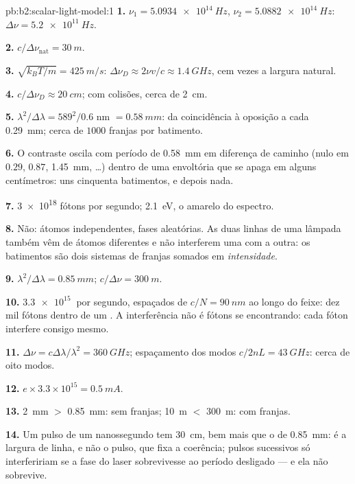 \begin{solution}{pb:b2:scalar-light-model:1}
\textbf{1.} $\nu_1 = \qty{5.0934e14}{Hz}$, $\nu_2 = \qty{5.0882e14}{Hz}$: $\Delta\nu = \qty{5.2e11}{Hz}$.

\textbf{2.} $c/\Delta\nu_{\text{nat}} = \qty{30}{m}$.

\textbf{3.} $\sqrt{k_BT/m} = \qty{425}{m/s}$: $\Delta\nu_D \approx 2\nu v/c \approx \qty{1.4}{GHz}$, cem
vezes a largura natural.

\textbf{4.} $c/\Delta\nu_D \approx \qty{20}{cm}$; com colisões, cerca de \qty{2}{cm}.

\textbf{5.} $\lambda^2/\Delta\lambda = 589^2/0.6$ nm $= \qty{0.58}{mm}$: da coincidência à
oposição a cada \qty{0.29}{mm}; cerca de $1000$ franjas por batimento.

\textbf{6.} O contraste oscila com período de \qty{0.58}{mm} em diferença de
caminho (nulo em $0.29$, $0.87$, \qty{1.45}{mm}, \dots) dentro de uma envoltória
que se apaga em alguns centímetros: uns cinquenta batimentos, e depois nada.

\textbf{7.} \qty{3e18}{} fótons por segundo; \qty{2.1}{eV}, o amarelo do
espectro.

\textbf{8.} Não: átomos independentes, fases aleatórias. As duas linhas de uma
lâmpada também vêm de átomos diferentes e não interferem uma com a
outra: os batimentos são dois sistemas de franjas somados em \emph{intensidade}.

\textbf{9.} $\lambda^2/\Delta\lambda = \qty{0.85}{mm}$; $c/\Delta\nu = \qty{300}{m}$.

\textbf{10.} $\qty{3.3e15}{}$ por segundo, espaçados de $c/N = \qty{90}{nm}$ ao longo do feixe:
dez mil fótons dentro de um . A interferência não é
fótons se encontrando: cada fóton interfere consigo mesmo.

\textbf{11.} $\Delta\nu = c\Delta\lambda/\lambda^2 = \qty{360}{GHz}$; espaçamento dos modos $c/2nL = \qty{43}{GHz}$:
cerca de oito modos.

\textbf{12.} $e \times 3.3 \times 10^{15} = \qty{0.5}{mA}$.

\textbf{13.} \qty{2}{mm} $>$ \qty{0.85}{mm}: sem franjas; \qty{10}{m} $<$ \qty{300}{m}: com franjas.

\textbf{14.} Um pulso de um nanossegundo tem \qty{30}{cm}, bem mais que o
 de \qty{0.85}{mm}: é a largura de linha, e não o pulso, que fixa a
coerência; pulsos sucessivos só interfeririam se a fase do laser
sobrevivesse ao período desligado --- e ela não sobrevive.


\end{solution}

